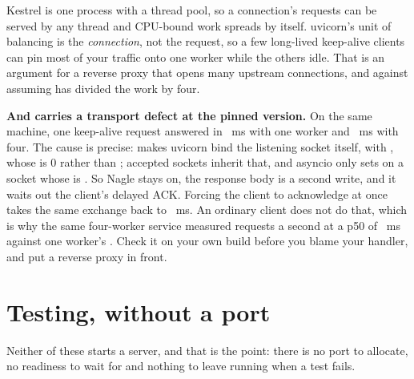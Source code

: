 
\begin{csbox}
Kestrel is one process with a thread pool, so a connection's requests can be
served by any thread and CPU-bound work spreads by itself. uvicorn's unit of
balancing is the \emph{connection}, not the request, so a few long-lived
keep-alive clients can pin most of your traffic onto one worker while the
others idle. That is an argument for a reverse proxy that opens many upstream
connections, and against assuming  has divided the work by
four.
\end{csbox}

\begin{versionbox}
\textbf{And  carries a transport defect at the pinned
version.} On the same machine, one keep-alive request answered in
~ms with one worker and ~ms with four.
The cause is precise:  makes uvicorn bind the listening
socket itself, with , whose
 is 0 rather than ; accepted sockets inherit
that, and asyncio only sets  on a socket whose
 is . So Nagle stays on, the response body is
a second write, and it waits out the client's delayed ACK. Forcing the client
to acknowledge at once takes the same exchange back to
~ms. An ordinary client does not do that, which is
why the same four-worker service measured 
requests a second at a p50 of ~ms against one
worker's . Check it on your own build before you
blame your handler, and put a reverse proxy in front.
\end{versionbox}

\section{Testing, without a port}
\label{sec:ch09-testing}

Neither of these starts a server, and that is the point: there is no port to
allocate, no readiness to wait for and nothing to leave running when a test
fails.


